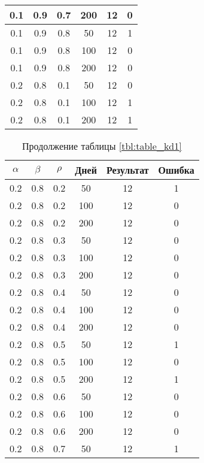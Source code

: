 \begin{table}[h]
\begin{center}
\begin{tabular}{|c|c|c|c|c|c|}
	0.1 &  0.9 &  0.7 &  200 &    12 &     0 \\
   \hline
	0.1 &  0.9 &  0.8 &   50 &    12 &     1 \\
	0.1 &  0.9 &  0.8 &  100 &    12 &     0 \\
	0.1 &  0.9 &  0.8 &  200 &    12 &     0 \\
   \hline
	0.2 &  0.8 &  0.1 &   50 &    12 &     0 \\
	0.2 &  0.8 &  0.1 &  100 &    12 &     1 \\
	0.2 &  0.8 &  0.1 &  200 &    12 &     1 \\
   \hline
 		\end{tabular}
	\end{center}
\end{table}
\begin{table}[h]
	\begin{center}
        \captionsetup{justification=raggedright,singlelinecheck=off}
		\caption*{Продолжение таблицы \ref{tbl:table_kd1}}
		\begin{tabular}{|c|c|c|c|c|c|}
  	\hline
	$\alpha$ & $\beta$ & $\rho$ & Дней & Результат & Ошибка \\
   \hline
	0.2 &  0.8 &  0.2 &   50 &    12 &     1 \\
	0.2 &  0.8 &  0.2 &  100 &    12 &     0 \\
	0.2 &  0.8 &  0.2 &  200 &    12 &     0 \\
   \hline
	0.2 &  0.8 &  0.3 &   50 &    12 &     0 \\
	0.2 &  0.8 &  0.3 &  100 &    12 &     0 \\
	0.2 &  0.8 &  0.3 &  200 &    12 &     0 \\
   \hline
	0.2 &  0.8 &  0.4 &   50 &    12 &     0 \\
	0.2 &  0.8 &  0.4 &  100 &    12 &     0 \\
	0.2 &  0.8 &  0.4 &  200 &    12 &     0 \\
   \hline
	0.2 &  0.8 &  0.5 &   50 &    12 &     1 \\
	0.2 &  0.8 &  0.5 &  100 &    12 &     0 \\
	0.2 &  0.8 &  0.5 &  200 &    12 &     1 \\ 
    \hline
	0.2 &  0.8 &  0.6 &   50 &    12 &     0 \\
	0.2 &  0.8 &  0.6 &  100 &    12 &     0 \\
	0.2 &  0.8 &  0.6 &  200 &    12 &     0 \\
   \hline
	0.2 &  0.8 &  0.7 &   50 &    12 &     1 \\

\end{tabular}
\end{center}
\end{table}
